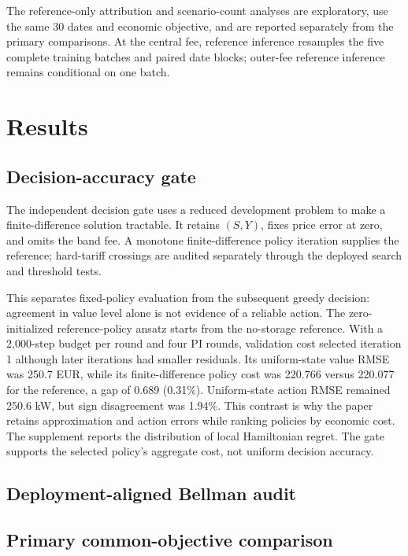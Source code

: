 \documentclass[preprint,11pt]{elsarticle}
\theoremstyle{plain}
\theoremstyle{remark}
\begin{document}
The reference-only attribution and scenario-count analyses are exploratory,
use the same 30 dates and economic objective, and are reported separately from
the primary comparisons. At the central fee,
reference inference resamples the five complete training batches and paired
date blocks; outer-fee reference inference remains conditional on one batch.

\section{Results}\label{sec:results}

\subsection{Decision-accuracy gate}\label{sec:gate}

The independent decision gate uses a reduced development problem to make a
finite-difference solution tractable. It retains
$(S,Y)$, fixes price error at zero, and omits the band fee. A monotone
finite-difference policy iteration supplies the reference; hard-tariff
crossings are audited separately through the deployed search and threshold
tests.

This separates fixed-policy evaluation from the subsequent greedy decision:
agreement in value level alone is not evidence of a reliable action.
The zero-initialized reference-policy ansatz starts from the no-storage
reference. With a 2,000-step budget per round and four PI rounds,
validation cost selected iteration 1 although later iterations
had smaller residuals. Its uniform-state value RMSE was 250.7 EUR, while its
finite-difference policy cost was 220.766 versus 220.077 for the reference, a
gap of 0.689 (0.31\%). Uniform-state action RMSE remained 250.6 kW, but sign
disagreement was 1.94\%. This contrast is why the paper retains approximation
and action errors while ranking policies by economic cost.
The supplement reports the distribution of local Hamiltonian regret.
The gate supports the selected policy's aggregate cost, not uniform decision accuracy.



\subsection{Deployment-aligned Bellman audit}



\subsection{Primary common-objective comparison}
\end{document}
